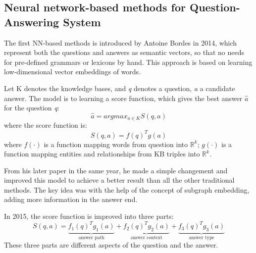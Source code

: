 \documentclass[12pt]{article}
\numberwithin{equation}{section}
\begin{document}
\subsection{Neural network-based methods for Question-Answering System}
	The first NN-based methods is introduced by Antoine Bordes in 2014\citep{bordes2014open}, which represent both the questions and answers as semantic vectors, so that no needs for pre-defined grammars or lexicons by hand. This approach is based on learning low-dimensional vector embeddings of words. \par
	Let K denotes the knowledge bases, and {\it q} denotes a question, {\it a} a candidate answer. The model is to learning a score function, which gives the best answer $\hat{a}$ for the question {\it q}: 
	\begin{equation}
		\hat{a} = argmax_{a \in K} S(q, a)
	\end{equation}
where the score function is:
	\begin{equation}
		S(q,a) = f(q)^T g(a)
	\end{equation} 
where $f(\cdot)$ is a function mapping words from question into $\mathbb{R}^k$; $g(\cdot)$ is a function mapping entities and relationships from KB triples into $\mathbb{R}^k$. \par 
	From his later paper in the same year\citep{bordes2014question}, he made a simple changement and improved this model to achieve a better result than all the other traditional methods. The key idea was with the help of the concept of subgraph embedding, adding more information in the answer end.\par
	In 2015, the score function is improved into three parts\citep{dong2015question}:
	\begin{equation}
		S(q,a) = \underbrace{f_1(q)^T g_1(a)}_{\text{answer path}} + \underbrace{f_2(q)^T g_2(a)}_{\text{answer context}}  + \underbrace{f_3(q)^T g_3(a)}_{\text{answer type}} 
	\end{equation}
These three parts are different aspects of the question and the answer. \par
\end{document}

